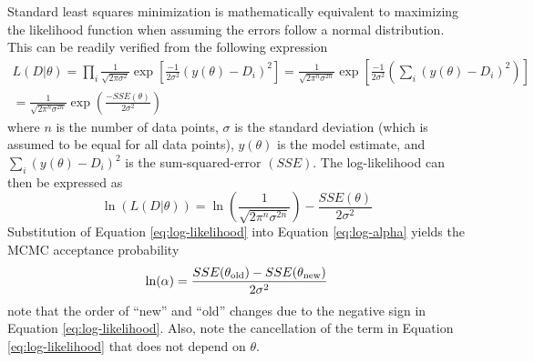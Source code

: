 \documentclass[preprint,review,11pt]{elsarticle}
\begin{document}
	Standard least squares minimization is mathematically equivalent to maximizing the likelihood function when assuming the errors follow a normal distribution. This can be readily verified from the following expression
	\begin{multline} \label{eq:likelihood}
	L(D|\theta) = \prod_i \frac{1}{\sqrt{2 \pi \sigma^{2}}} \exp\left[\frac{-1}{2\sigma^2}(y(\theta)-D_i)^2\right] = \frac{1}{\sqrt{2 \pi^n \sigma^{2n}}} \exp\left[\frac{-1}{2\sigma^2}\left(\sum_i(y(\theta)-D_i)^2\right)\right] \\ = \frac{1}{\sqrt{2 \pi^n \sigma^{2n}}} \exp\left(\frac{-SSE(\theta)}{2\sigma^2}\right)
	\end{multline}
	where $n$ is the number of data points, $\sigma$ is the standard deviation (which is assumed to be equal for all data points), $y(\theta)$ is the model estimate, and $\sum_i(y(\theta)-D_i)^2$ is the sum-squared-error $(SSE)$. The log-likelihood can then be expressed as    
	\begin{equation} \label{eq:log-likelihood}
	\ln(L(D|\theta)) = \ln\left(\frac{1}{\sqrt{2 \pi^n \sigma^{2n}}}\right) - \frac{SSE(\theta)}{2\sigma^2}
	\end{equation}  
	Substitution of Equation \ref{eq:log-likelihood} into Equation \ref{eq:log-alpha} yields the MCMC acceptance probability
	\begin{equation}
	\ln(\alpha) = \frac{SSE(\theta_{\rm old}) - SSE(\theta_{\rm new})}{2\sigma^2}
	\end{equation}
	note that the order of ``new'' and ``old'' changes due to the negative sign in Equation \ref{eq:log-likelihood}. Also, note the cancellation of the term in Equation \ref{eq:log-likelihood} that does not depend on $\theta$.
	
	
\end{document}
